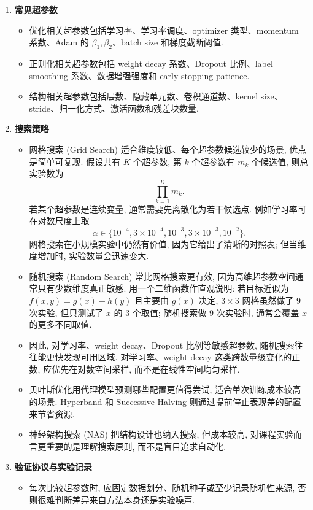 \documentclass{../nndlcourse}
\begin{document}
\begin{enumerate}
  \item \textbf{常见超参数}
    \begin{itemize}
      \item 优化相关超参数包括学习率、学习率调度、optimizer 类型、momentum 系数、Adam 的 $\beta_1,\beta_2$、batch size 和梯度截断阈值.
      \item 正则化相关超参数包括 weight decay 系数、Dropout 比例、label smoothing 系数、数据增强强度和 early stopping patience.
      \item 结构相关超参数包括层数、隐藏单元数、卷积通道数、kernel size、stride、归一化方式、激活函数和残差块数量.
    \end{itemize}
  \item \textbf{搜索策略}
    \begin{itemize}
      \item 网格搜索 (Grid Search) 适合维度较低、每个超参数候选较少的场景, 优点是简单可复现. 假设共有 $K$ 个超参数, 第 $k$ 个超参数有 $m_k$ 个候选值, 则总实验数为
      \[
        \prod_{k=1}^{K}m_k.
      \]
      若某个超参数是连续变量, 通常需要先离散化为若干候选点. 例如学习率可在对数尺度上取
      \[
        \alpha\in\{10^{-4},3\times 10^{-4},10^{-3},3\times 10^{-3},10^{-2}\}.
      \]
      网格搜索在小规模实验中仍然有价值, 因为它给出了清晰的对照表; 但当维度增加时, 实验数量会迅速变大.
      \item 随机搜索 (Random Search) 常比网格搜索更有效, 因为高维超参数空间通常只有少数维度真正敏感. 用一个二维函数作直观说明: 若目标近似为 $f(x,y)=g(x)+h(y)$ 且主要由 $g(x)$ 决定, $3\times 3$ 网格虽然做了 $9$ 次实验, 但只测试了 $x$ 的 $3$ 个取值; 随机搜索做 $9$ 次实验时, 通常会覆盖 $x$ 的更多不同取值.
      \item 因此, 对学习率、weight decay、Dropout 比例等敏感超参数, 随机搜索往往能更快发现可用区域. 对学习率、weight decay 这类跨数量级变化的正数, 应优先在对数空间采样, 而不是在线性空间均匀采样.
      \item 贝叶斯优化用代理模型预测哪些配置更值得尝试, 适合单次训练成本较高的场景. Hyperband 和 Successive Halving 则通过提前停止表现差的配置来节省资源.
      \item 神经架构搜索 (NAS) 把结构设计也纳入搜索, 但成本较高, 对课程实验而言更重要的是理解搜索原则, 而不是盲目追求自动化.
    \end{itemize}
  \item \textbf{验证协议与实验记录}
    \begin{itemize}
      \item 每次比较超参数时, 应固定数据划分、随机种子或至少记录随机性来源, 否则很难判断差异来自方法本身还是实验噪声.

\end{itemize}
\end{enumerate}
\end{document}
